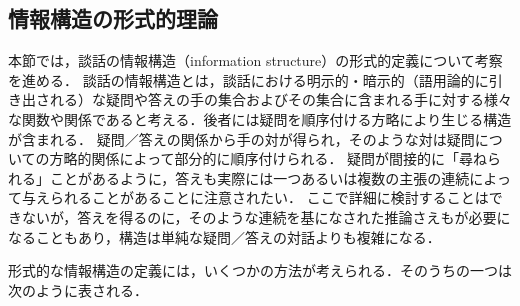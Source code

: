 \documentclass{goken}
\newcommand{\term}[2]{\textsf{#1}（#2）}
\begin{document}
\subsection{情報構造の形式的理論}\label{sec:1.2}

本節では，談話の\term{情報構造}{information structure}の形式的定義について考察を進める．
談話の情報構造とは，談話における明示的・暗示的（語用論的に引き出される）な疑問や答えの手の集合およびその集合に含まれる手に対する様々な関数や関係であると考える．後者には疑問を順序付ける方略により生じる構造が含まれる．
疑問／答えの関係から手の対が得られ，そのような対は疑問についての方略的関係によって部分的に順序付けられる．
疑問が間接的に「尋ねられる」ことがあるように，答えも実際には一つあるいは複数の主張の連続によって与えられることがあることに注意されたい．
ここで詳細に検討することはできないが，答えを得るのに，そのような連続を基になされた推論さえもが必要になることもあり，構造は単純な疑問／答えの対話よりも複雑になる．

形式的な情報構造の定義には，いくつかの方法が考えられる．そのうちの一つは次のように表される．
\end{document}
